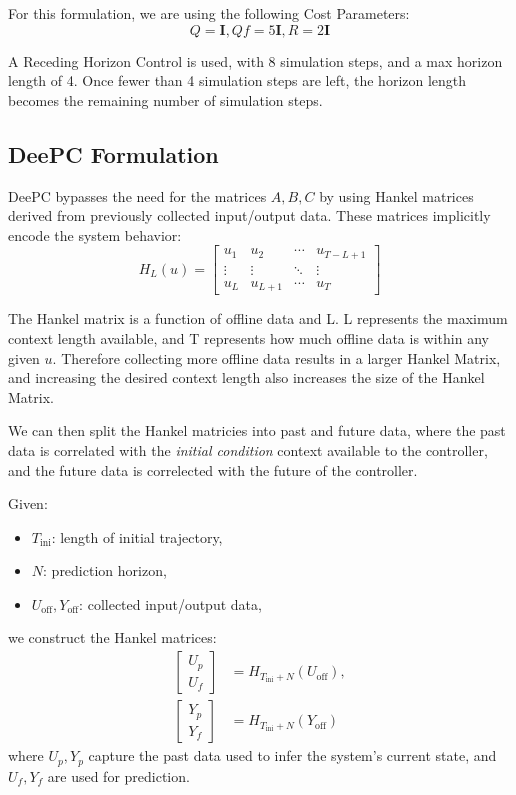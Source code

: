\documentclass[11pt,a4paper]{article}
\begin{document}
For this formulation, we are using the following Cost Parameters:
$$Q = \mathbf{I}, Qf=5\mathbf{I}, R=2\mathbf{I}$$

A Receding Horizon Control is used, with 8 simulation steps, and a max horizon length of 4. Once fewer than 4 simulation steps are left, the horizon length becomes the remaining number of simulation steps.


\subsection{DeePC Formulation}
DeePC bypasses the need for the matrices \(A, B, C\) by using Hankel matrices derived from previously collected input/output data. These matrices implicitly encode the system behavior:
\[
H_L(u) = \begin{bmatrix}
u_1 & u_2 & \cdots & u_{T-L+1} \\
\vdots & \vdots & \ddots & \vdots \\
u_L & u_{L+1} & \cdots & u_T
\end{bmatrix}
\]

The Hankel matrix is a function of offline data and L. L represents the maximum context length available, and T represents how much offline data is within any given $u$. Therefore collecting more offline data results in a larger Hankel Matrix, and increasing the desired context length also increases the size of the Hankel Matrix.

We can then split the Hankel matricies into past and future data, where the past data is correlated with the \textit{initial condition} context available to the controller, and the future data is correlected with the future of the controller.

Given:
\begin{itemize}
    \item \( T_{\text{ini}} \): length of initial trajectory,
    \item \( N \): prediction horizon,
    \item \( U_{\text{off}}, Y_{\text{off}} \): collected input/output data,
\end{itemize}
we construct the Hankel matrices:
\[
\begin{aligned}
\begin{bmatrix}
U_p \\
U_f
\end{bmatrix}
&= H_{T_{\text{ini}} + N}(U_{\text{off}}), \\
\begin{bmatrix}
Y_p \\
Y_f
\end{bmatrix}
&= H_{T_{\text{ini}} + N}(Y_{\text{off}})
\end{aligned}
\]
where \(U_p, Y_p\) capture the past data used to infer the system's current state, and \(U_f, Y_f\) are used for prediction.
\end{document}
